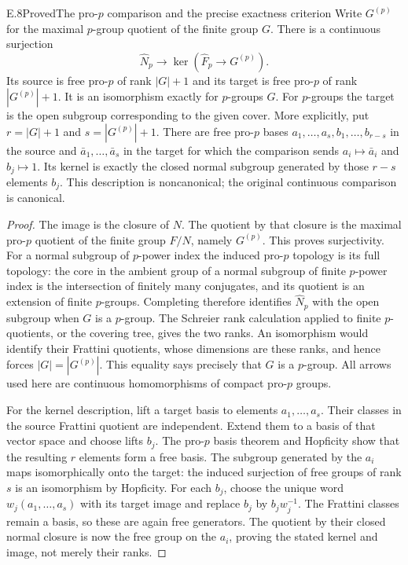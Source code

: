 \begin{statement}{E.8}{Proved}{The pro-$p$ comparison and the precise exactness criterion}
Write $G^{(p)}$ for the maximal $p$-group quotient of the finite
group $G$. There is a continuous surjection
\[
 \widehat N_p\longrightarrow
 \ker(\widehat F_p\longrightarrow G^{(p)}).
\]
Its source is free pro-$p$ of rank $|G|+1$ and its target is free
pro-$p$ of rank $|G^{(p)}|+1$. It is an isomorphism exactly for
$p$-groups $G$. For $p$-groups the target is the open subgroup
corresponding to the given cover.
More explicitly, put $r=|G|+1$ and $s=|G^{(p)}|+1$.
There are free pro-$p$ bases $a_1,\ldots,a_s,b_1,\ldots,b_{r-s}$
in the source and $\bar a_1,\ldots,\bar a_s$ in the target
for which the comparison sends $a_i\mapsto\bar a_i$ and
$b_j\mapsto1$. Its kernel is exactly the closed normal subgroup
generated by those $r-s$ elements $b_j$. This description is
noncanonical; the original continuous comparison is canonical.
\end{statement}
\begin{proof}
The image is the closure of $N$. The quotient by that closure is
the maximal pro-$p$ quotient of the finite group $F/N$, namely
$G^{(p)}$. This proves surjectivity. For a normal subgroup of
$p$-power index the induced pro-$p$ topology is its full topology:
the core in the ambient group of a normal subgroup of finite
$p$-power index is the intersection of finitely many conjugates,
and its quotient is an extension of finite $p$-groups.
Completing therefore identifies $\widehat N_p$ with the open
subgroup when $G$ is a $p$-group. The Schreier rank calculation
applied to finite $p$-quotients, or the covering tree, gives the
two ranks. An isomorphism would identify their Frattini quotients,
whose dimensions are these ranks, and hence forces
$|G|=|G^{(p)}|$. This equality says precisely that $G$ is a
$p$-group. All arrows used here are continuous homomorphisms of
compact pro-$p$ groups.

For the kernel description, lift a target basis to elements
$a_1,\ldots,a_s$. Their classes in the source Frattini quotient
are independent. Extend them to a basis of that vector space and
choose lifts $b_j$. The pro-$p$ basis theorem and Hopficity show
that the resulting $r$ elements form a free basis. The subgroup
generated by the $a_i$ maps isomorphically onto the target:
the induced surjection of free groups of rank $s$ is an
isomorphism by Hopficity. For each $b_j$, choose the unique
word $w_j(a_1,\ldots,a_s)$ with its target image and replace
$b_j$ by $b_jw_j^{-1}$. The Frattini classes remain a basis,
so these are again free generators. The quotient by their closed
normal closure is now the free group on the $a_i$, proving the
stated kernel and image, not merely their ranks.
\end{proof}

